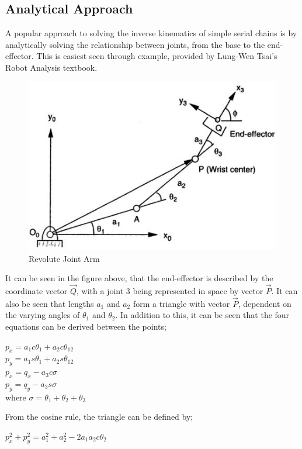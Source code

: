 \documentclass[12pt,openany,a4paper]{book}
\begin{document}
\subsection{Analytical Approach}

A popular approach to solving the inverse kinematics of simple serial chains is by analytically solving the relationship between joints, from the base to the end-effector. This is easiest seen through example, provided by Lung-Wen Tsai's Robot Analysis textbook.

\begin{center}
\begin{figure}[htb]
  \includegraphics[width=0.8\linewidth]{Tsai_3rr.jpg}
\caption{Revolute Joint Arm}
\end{figure}
\end{center}

It can be seen in the figure above, that the end-effector is described by the coordinate vector $\vec{Q}$, with a joint 3 being represented in space by vector $\vec{P}$. It can also be seen that lengths $a_1$ and $a_2$ form a triangle with vector $\vec{P}$, dependent on the varying angles of $\theta_1$ and $\theta_2$. In addition to this, it can be seen that the four equations can be derived between the points;

$p_x = a_1 c\theta_1 + a_2 c \theta_{12}$\\
$p_y = a_1 s\theta_1 + a_2 s \theta_{12}$\\
$p_x = q_x - a_3 c\sigma$\\
$p_y = q_y - a_3 s\sigma$\\

where $\sigma = \theta_1 + \theta_2 + \theta_3$

From the cosine rule, the triangle can be defined by;

$p_x^2 + p_y^2 = a_1^2 + a_2^2 - 2 a_1 a_2 c \theta_2$
\end{document}
